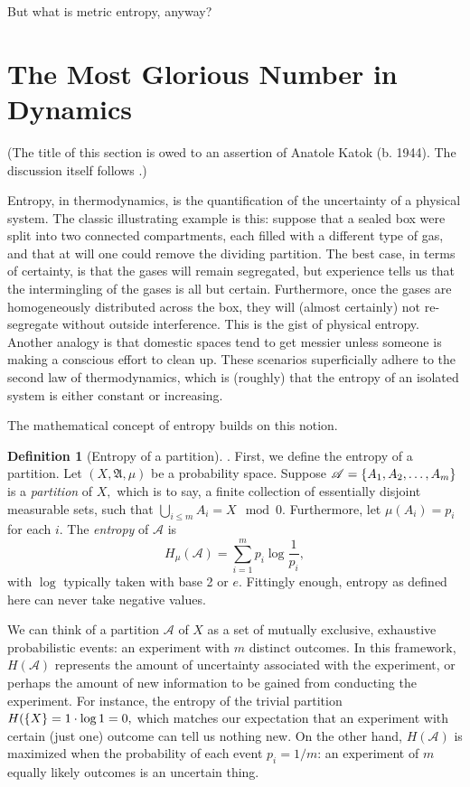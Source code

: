 \documentclass[12pt, letterpaper, oneside]{book}
\newcommand{\gm}{\ensuremath{\mu}}
\DeclarePairedDelimiter{\set}{\lbrace}{\rbrace}
\theoremstyle{plain}
\theoremstyle{definition}
\newtheorem{definition}{Definition}
\theoremstyle{remark}
\begin{document}
But what is metric entropy, anyway?

\section{The Most Glorious Number in Dynamics}

(The title of this section is owed to an assertion of Anatole Katok (b. 1944). The discussion itself follows \cite{Mor05}.)

Entropy, in thermodynamics, is the quantification of the uncertainty of a physical system. The classic illustrating example is this: suppose that a sealed box were split into two connected compartments, each filled with a different type of gas, and that at will one could remove the dividing partition. The best case, in terms of certainty, is that the gases will remain segregated, but experience tells us that the intermingling of the gases is all but certain. Furthermore, once the gases are homogeneously distributed across the box, they will (almost certainly) not re-segregate without outside interference. This is the gist of physical entropy. Another analogy is that domestic spaces tend to get messier unless someone is making a conscious effort to clean up. These scenarios superficially adhere to the second law of thermodynamics, which is (roughly) that the entropy of an isolated system is either constant or increasing.


The mathematical concept of entropy builds on this notion.
\begin{definition}[Entropy of a partition]
. First, we define the entropy of a partition. Let $(X, \mathfrak{A}, \mu)$ be a probability space. Suppose $\mathscr{A} = \set{A_1,A_2,\ldots, A_m}$ is a \textit{partition} of $X,$ which is to say, a finite collection of essentially disjoint measurable sets, such that $\bigcup_{i \leq m} A_i = X\mod 0.$ Furthermore, let $\mu(A_i) = p_i$ for each $i.$ The \textit{entropy} of $\mathscr{A}$ is
\[
H_{\gm}(\mathscr{A}) = \sum_{i = 1}^{m} p_i \log \frac{1}{p_i},
\]
with $\log$ typically taken with base 2 or $e.$ Fittingly enough, entropy as defined here can never take negative values.
\end{definition}

We can think of a partition $\mathscr{A}$ of $X$ as a set of mutually exclusive, exhaustive probabilistic events: an experiment with $m$ distinct outcomes. In this framework, $H(\mathcal{A})$ represents the amount of uncertainty associated with the experiment, or perhaps the amount of new information to be gained from conducting the experiment. For instance, the entropy of the trivial partition $H(\set{X} = 1 \cdot \log 1 = 0,$ which matches our expectation that an experiment with certain (just one) outcome can tell us nothing new. On the other hand, $H(\mathscr{A})$ is maximized when the probability of each event $p_i = 1/m$: an experiment of $m$ equally likely outcomes is an uncertain thing. 
\end{document}
